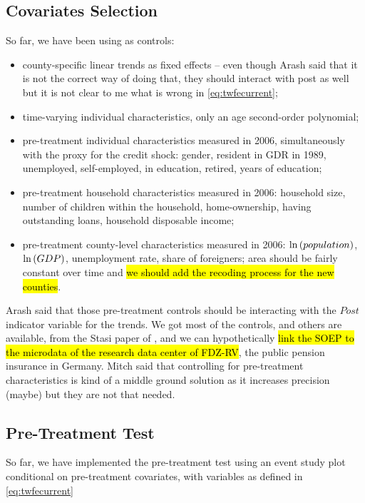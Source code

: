 \documentclass[11pt]{article}
\begin{document}
\subsection{Covariates Selection}\label{sec:covariates}

So far, we have been using as controls:

\begin{itemize}
    \item county-specific linear trends as fixed effects -- even though Arash said that it is not the correct way of doing that, they should interact with post as well but it is not clear to me what is wrong in \ref{eq:twfecurrent};
    \item time-varying individual characteristics, only an age second-order polynomial;
    \item pre-treatment individual characteristics measured in 2006, simultaneously with the proxy for the credit shock: gender, resident in GDR in 1989, unemployed, self-employed, in education, retired, years of education;
    \item pre-treatment household characteristics measured in 2006: household size, number of children within the household, home-ownership, having outstanding loans, household disposable income;
    \item pre-treatment county-level characteristics measured in 2006: $\ln\left( population \right)$, $\ln\left( GDP \right)$, unemployment rate, share of foreigners; area should be fairly constant over time and \hl{we should add the recoding process for the new counties}.
\end{itemize}

Arash said that those pre-treatment controls should be interacting with the $Post$ indicator variable for the trends. We got most of the controls, and others are available, from the Stasi paper of \citet{bib:lichter2020}, and we can hypothetically \hl{link the SOEP to the microdata of the research data center of FDZ-RV}, the public pension insurance in Germany. Mitch said that controlling for pre-treatment characteristics is kind of a middle ground solution as it increases precision (maybe) but they are not that needed.

\subsection{Pre-Treatment Test}\label{sec:pretrends}

So far, we have implemented the pre-treatment test using an event study plot conditional on pre-treatment covariates, with variables as defined in \eqref{eq:twfecurrent}
\end{document}
